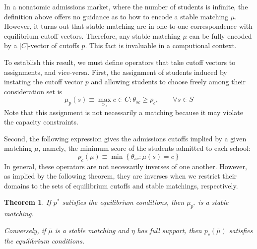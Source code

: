 \documentclass[12pt]{article}
\newtheorem{theorem}{Theorem}
\theoremstyle{definition}
\begin{document}
In a nonatomic admissions market, where the number of students is infinite, the definition above offers no guidance as to how to encode a stable matching $\mu$. However, it turns out that stable matching are in one-to-one correspondence with equilibrium cutoff vectors. Therefore, any stable matching $\mu$ can be fully encoded by a $|C|$-vector of cutoffs $p$. This fact is invaluable in a computional context.

To establish this result, we must define operators that take cutoff vectors to assignments, and vice-versa. First, the assignment of students induced by instating the cutoff vector $p$ and allowing students to choose freely among their consideration set is
\[\mu_p(s) \equiv \max_{>_s} c \in C : \theta_{sc} \geq p_c, \qquad \forall s \in S\]  %
Note that this assignment is not necessarily a matching because it may violate the capacity constraints. 

Second, the following expression gives the admissions cutoffs implied by a given matching $\mu$, namely, the minimum score of the students admitted to each school:
\[p_c(\mu) \equiv \min \left\{\theta_{sc}: \mu(s) = c\right\}\]
In general, these operators are not necessarily inverses of one another. However, as implied by the following theorem, they are inverses when we restrict their domains to the sets of equilibrium cutoffs and stable matchings, respectively. 

\begin{theorem}If $p^*$ satisfies the equilibrium conditions, then $\mu_{p^*}$ is a stable matching. 

Conversely, if $\bar \mu$ is a stable matching and $\eta$ has full support, then $p_c(\bar \mu)$ satisfies the equilibrium conditions. \end{theorem}
\end{document}
